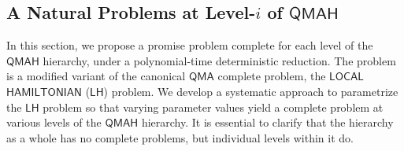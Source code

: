 \documentclass[11pt]{article}
\newcommand{\ms}[1]{\mathsf{#1}}
\begin{document}
\subsection{A Natural Problems at Level-$i$ of $\ms{QMAH}$}
In this section, we propose a promise problem complete for each level of the $\ms{QMAH}$ hierarchy, under a polynomial-time deterministic reduction. The problem is a modified variant of the canonical $\ms{QMA}$ complete problem, the $\ms{LOCAL}$ $\ms{HAMILTONIAN}$ ($\ms{LH}$) problem\cite{kempe2004complexity}. We develop a systematic approach to parametrize the $\ms{LH}$ problem so that varying parameter values yield a complete problem at various levels of the $\ms{QMAH}$ hierarchy. It is essential to clarify that the hierarchy as a whole has no complete problems, but individual levels within it do.
\end{document}
